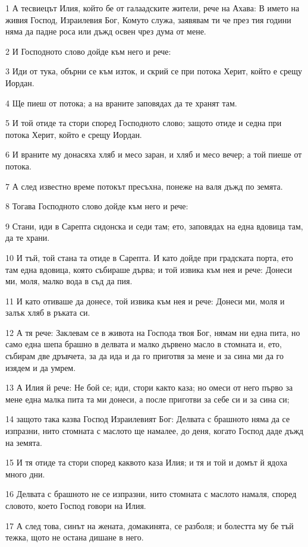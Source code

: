 \par 1 А тесвиецът Илия, който бе от галаадските жители, рече на Ахава: В името на живия Господ, Израилевия Бог, Комуто служа, заявявам ти че през тия години няма да падне роса или дъжд освен чрез дума от мене.
\par 2 И Господното слово дойде към него и рече:
\par 3 Иди от тука, обърни се към изток, и скрий се при потока Херит, който е срещу Иордан.
\par 4 Ще пиеш от потока; а на враните заповядах да те хранят там.
\par 5 И той отиде та стори според Господното слово; защото отиде и седна при потока Херит, който е срещу Иордан.
\par 6 И враните му донасяха хляб и месо заран, и хляб и месо вечер; а той пиеше от потока.
\par 7 А след известно време потокът пресъхна, понеже на валя дъжд по земята.
\par 8 Тогава Господното слово дойде към него и рече:
\par 9 Стани, иди в Сарепта сидонска и седи там; ето, заповядах на една вдовица там, да те храни.
\par 10 И тъй, той стана та отиде в Сарепта. И като дойде при градската порта, ето там една вдовица, която събираше дърва; и той извика към нея и рече: Донеси ми, моля, малко вода в съд да пия.
\par 11 И като отиваше да донесе, той извика към нея и рече: Донеси ми, моля и залък хляб в ръката си.
\par 12 А тя рече: Заклевам се в живота на Господа твоя Бог, нямам ни една пита, но само една шепа брашно в делвата и малко дървено масло в стомната и, ето, събирам две дръвчета, за да ида и да го приготвя за мене и за сина ми да го изядем и да умрем.
\par 13 А Илия й рече: Не бой се; иди, стори както каза; но омеси от него първо за мене една малка пита та ми донеси, а после приготви за себе си и за сина си;
\par 14 защото така казва Господ Израилевият Бог: Делвата с брашното няма да се изпразни, нито стомната с маслото ще намалее, до деня, когато Господ даде дъжд на земята.
\par 15 И тя отиде та стори според каквото каза Илия; и тя и той и домът й ядоха много дни.
\par 16 Делвата с брашното не се изпразни, нито стомната с маслото намаля, според словото, което Господ говори на Илия.
\par 17 А след това, синът на жената, домакинята, се разболя; и болестта му бе тъй тежка, щото не остана дишане в него.
